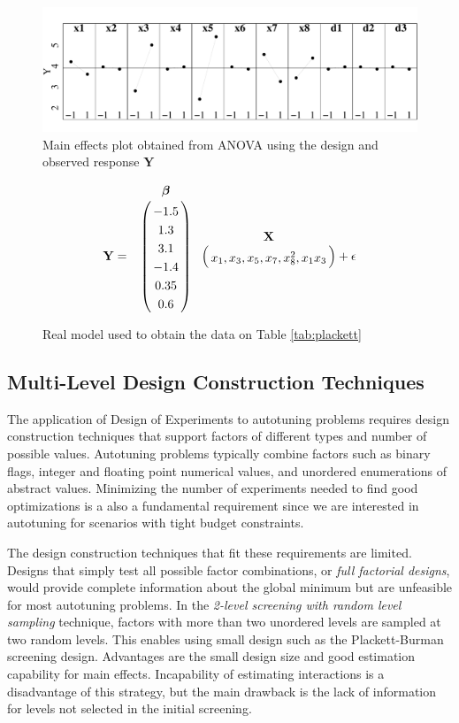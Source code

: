\documentclass[conference]{IEEEtran}
\begin{document}
\begin{center}
\begin{figure}[htbp]
\centering
\includegraphics[width=.95\columnwidth]{./img/main_effects.pdf}
\caption{\label{fig:org53d5860}
Main effects plot obtained from ANOVA using the design and observed response \(\mathbf{Y}\)}
\end{figure}
\end{center}

\begin{figure}
{\small
\begin{align*}
\mathbf{Y} = \bordermatrix{~ & \bm{\beta} \cr & -1.5 \cr & 1.3 \cr & 3.1 \cr & -1.4 \cr & 0.35 \cr & 0.6 } \bordermatrix{~ & \mathbf{X} \cr & x_1, x_3, x_5, x_7, x_{8}^{2}, x_1x_3} + \epsilon
\end{align*}
}
\caption{Real model used to obtain the data on Table \ref{tab:plackett}}
\end{figure}
\subsection{Multi-Level Design Construction Techniques}
\label{sec:orga862c25}
The application of Design of Experiments to autotuning problems requires design
construction techniques that support factors of different types and number of
possible values. Autotuning problems typically combine factors such as binary
flags, integer and floating point numerical values, and unordered enumerations
of abstract values. Minimizing the number of experiments needed to find good
optimizations is a also a fundamental requirement since we are interested in
autotuning for scenarios with tight budget constraints.

The design construction techniques that fit these requirements are limited.
Designs that simply test all possible factor combinations, or \emph{full factorial
designs}, would provide complete information about the global minimum but are
unfeasible for most autotuning problems. In the \emph{2-level screening with random
level sampling} technique, factors with more than two unordered levels are
sampled at two random levels. This enables using small design such as the
Plackett-Burman~\cite{plackett1946design} screening design. Advantages are
the small design size and good estimation capability for main effects.
Incapability of estimating interactions is a disadvantage of this strategy, but
the main drawback is the lack of information for levels not selected in the
initial screening.
\end{document}
